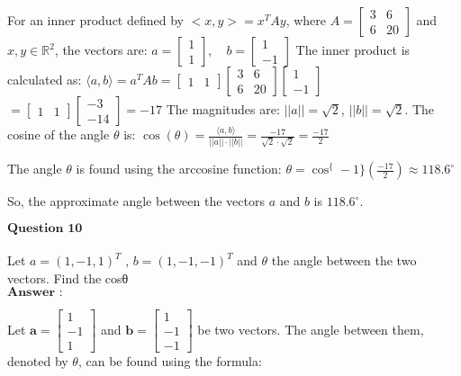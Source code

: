 \documentclass[11pt]{article}
\begin{document}
    For an inner product defined by $<x,y>=x^TAy$, where
$A=\begin{bmatrix} 3 & 6 \\ 6 & 20 \end{bmatrix}$ and
$x,y \in \mathbb{R}^2$, the vectors are: $ a =
\begin{bmatrix} 1 \\ 1 \end{bmatrix}
, \quad b =
\begin{bmatrix} 1 \\ -1 \end{bmatrix}
$
The inner product is calculated as: $ \langle a, b \rangle = a^TA b
=
\begin{bmatrix} 1 & 1 \end{bmatrix} \begin{bmatrix} 3 & 6 \\ 6 & 20 \end{bmatrix} \begin{bmatrix} 1 \\ -1 \end{bmatrix}
$
$ =
\begin{bmatrix} 1 & 1 \end{bmatrix} \begin{bmatrix} -3 \\ -14 \end{bmatrix}
= -17 $
The magnitudes are: $||a|| = \sqrt{2}$, $||b|| = \sqrt{2}$.
The cosine of the angle $\theta$ is: $ \cos(\theta) =
\frac{\langle a, b \rangle}{||a|| \cdot ||b||} =
\frac{-17}{\sqrt{2} \cdot \sqrt{2}} = \frac{-17}{2} $

The angle $\theta$ is found using the arccosine function: $ \theta =
\cos^\{-1\}\left(\frac{-17}{2}\right) \approx 118.6^\circ $

So, the approximate angle between the vectors $a$ and $b$ is
$118.6^\circ$.

    $\textbf{Question 10}$\\
~\\
Let $a=(1,−1,1)^T$ , $b=(1,−1,−1)^T$ and $θ$ the angle between the
two vectors. Find the cosθ\\
$\textbf{Answer :}$

    Let $\mathbf{a} = \begin{bmatrix} 1 \\ -1 \\ 1 \end{bmatrix}$ and
$\mathbf{b} = \begin{bmatrix} 1 \\ -1 \\ -1 \end{bmatrix}$ be two
vectors. The angle between them, denoted by $\theta$, can be found
using the formula:
\end{document}
